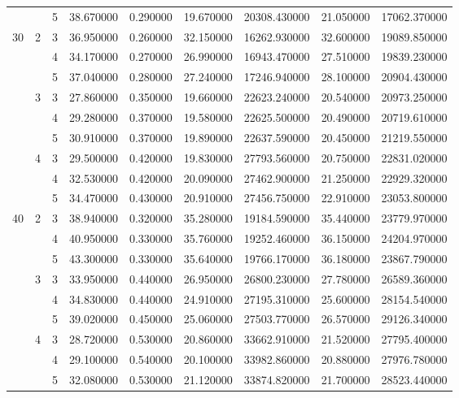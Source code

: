 \begin{tabular}{lllrrrrrr}
 &  & 5 & 38.670000 & 0.290000 & 19.670000 & 20308.430000 & 21.050000 & 17062.370000 \\
\cline{1-9} \cline{2-9}
\multirow[t]{9}{*}{30} & \multirow[t]{3}{*}{2} & 3 & 36.950000 & 0.260000 & 32.150000 & 16262.930000 & 32.600000 & 19089.850000 \\
 &  & 4 & 34.170000 & 0.270000 & 26.990000 & 16943.470000 & 27.510000 & 19839.230000 \\
 &  & 5 & 37.040000 & 0.280000 & 27.240000 & 17246.940000 & 28.100000 & 20904.430000 \\
\cline{2-9}
 & \multirow[t]{3}{*}{3} & 3 & 27.860000 & 0.350000 & 19.660000 & 22623.240000 & 20.540000 & 20973.250000 \\
 &  & 4 & 29.280000 & 0.370000 & 19.580000 & 22625.500000 & 20.490000 & 20719.610000 \\
 &  & 5 & 30.910000 & 0.370000 & 19.890000 & 22637.590000 & 20.450000 & 21219.550000 \\
\cline{2-9}
 & \multirow[t]{3}{*}{4} & 3 & 29.500000 & 0.420000 & 19.830000 & 27793.560000 & 20.750000 & 22831.020000 \\
 &  & 4 & 32.530000 & 0.420000 & 20.090000 & 27462.900000 & 21.250000 & 22929.320000 \\
 &  & 5 & 34.470000 & 0.430000 & 20.910000 & 27456.750000 & 22.910000 & 23053.800000 \\
\cline{1-9} \cline{2-9}
\multirow[t]{9}{*}{40} & \multirow[t]{3}{*}{2} & 3 & 38.940000 & 0.320000 & 35.280000 & 19184.590000 & 35.440000 & 23779.970000 \\
 &  & 4 & 40.950000 & 0.330000 & 35.760000 & 19252.460000 & 36.150000 & 24204.970000 \\
 &  & 5 & 43.300000 & 0.330000 & 35.640000 & 19766.170000 & 36.180000 & 23867.790000 \\
\cline{2-9}
 & \multirow[t]{3}{*}{3} & 3 & 33.950000 & 0.440000 & 26.950000 & 26800.230000 & 27.780000 & 26589.360000 \\
 &  & 4 & 34.830000 & 0.440000 & 24.910000 & 27195.310000 & 25.600000 & 28154.540000 \\
 &  & 5 & 39.020000 & 0.450000 & 25.060000 & 27503.770000 & 26.570000 & 29126.340000 \\
\cline{2-9}
 & \multirow[t]{3}{*}{4} & 3 & 28.720000 & 0.530000 & 20.860000 & 33662.910000 & 21.520000 & 27795.400000 \\
 &  & 4 & 29.100000 & 0.540000 & 20.100000 & 33982.860000 & 20.880000 & 27976.780000 \\
 &  & 5 & 32.080000 & 0.530000 & 21.120000 & 33874.820000 & 21.700000 & 28523.440000 \\

\end{tabular}
